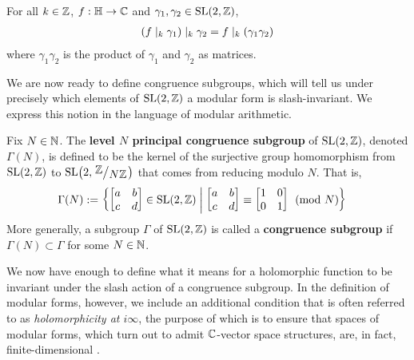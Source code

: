 \begin{boxlemma}\label{Ch2:Lemma:Slash_Mul}
    For all $k \in \mathbb{Z}$, $f : \mathbb{H} \to \mathbb{C}$ and $\gamma_1, \gamma_2 \in \operatorname{SL}\!\left( 2, \mathbb{Z} \right)$,
    \begin{align*}
        \left( f \mid_k \gamma_1 \right) \mid_k \gamma_2 = f \mid_k \left( \gamma_1 \gamma_2 \right)
    \end{align*}
    where $\gamma_1 \gamma_2$ is the product of $\gamma_1$ and $\gamma_2$ as matrices.
\end{boxlemma}

We are now ready to define congruence subgroups, which will tell us under precisely which elements of $\operatorname{SL}\!\left( 2, \mathbb{Z} \right)$ a modular form is slash-invariant. We express this notion in the language of modular arithmetic.

\begin{boxdefinition}\label{Ch2:Def:Cong_Subgroup}
    Fix $N \in \mathbb{N}$. The \textbf{level $N$ principal congruence subgroup} of $\operatorname{SL}\!\left( 2, \mathbb{Z} \right)$, denoted $\Gamma(N)$, is defined to be the kernel of the surjective group homomorphism from $\operatorname{SL}\!\left( 2, \mathbb{Z} \right)$ to $\SL{2, \Zmod{N}}$ that comes from reducing modulo $N$. That is,
    \begin{align}
        \Gamma(N) &:= \left\{ 
        \begin{bmatrix}
            a & b \\ c & d
        \end{bmatrix} \in \operatorname{SL}\!\left( 2, \mathbb{Z} \right) \; \middle\vert \; 
        \begin{bmatrix}
            a & b \\ c & d
        \end{bmatrix}
        \equiv
        \begin{bmatrix}
            1 & 0 \\ 0 & 1
        \end{bmatrix}
        \pmod{N} \right\}
        \label{Ch2:Eq:PrincipalCongruenceSubgroup_def}
    \end{align}
    More generally, a subgroup $\Gamma$ of $\operatorname{SL}\!\left( 2, \mathbb{Z} \right)$ is called a \textbf{congruence subgroup} if $\Gamma(N) \subset \Gamma$ for some $N \in \mathbb{N}$.
\end{boxdefinition}

We now have enough to define what it means for a holomorphic function to be invariant under the slash action of a congruence subgroup. In the definition of modular forms, however, we include an additional condition that is often referred to as \textit{holomorphicity at $i\infty$}, the purpose of which is to ensure that spaces of modular forms, which turn out to admit $\mathbb{C}$-vector space structures, are, in fact, finite-dimensional \cite{KevinFamilies}.

